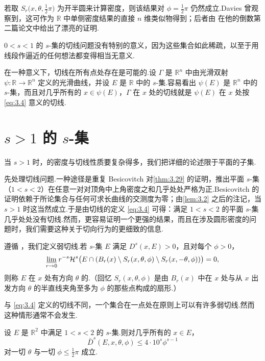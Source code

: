 若取 $S_r\bigl(x,\theta,\frac{1}{2}\pi\bigr)$ 为开半圆来计算密度，则该结果对 $\phi=\frac{1}{2}\pi$ 仍然成立.Davies 曾观察到，这可作为 $\mathbb{R}$ 中单侧密度结果的直接 $n$ 维类似物得到；后者由 \textcite{besicovitch1968} 在他的倒数第二篇论文中给出了漂亮的证明.

$0<s<1$ 的 $s$-集的切线问题没有特别的意义，因为这些集合如此稀疏，以至于用线段作逼近的任何想法都变得相当无意义.

在一种意义下，切线在所有点处存在是可能的.设 $\Gamma$ 是 $\mathbb{R}^n$ 中由光滑双射 $\psi:\mathbb{R}\to\mathbb{R}^n$ 定义的光滑曲线，并设 $E$ 是 $\mathbb{R}$ 中的 $s$-集.容易看出 $\psi(E)$ 是 $\mathbb{R}^n$ 中的 $s$-集，而且对几乎所有的 $x\in\psi(E)$，$\Gamma$ 在 $x$ 处的切线就是 $\psi(E)$ 在 $x$ 处按 \eqref{eq:3.4} 意义的切线.

\section{\texorpdfstring{$s>1$ 的 $s$-集}{s>1 的 s-集}}

当 $s>1$ 时，的密度与切线性质要复杂得多，我们把详细的论述限于平面的子集.

先处理切线问题.一种途径是重复 Besicovitch 对\cref{thm:3.29} 的证明，推出平面 $s$-集（$1<s<2$）在任意一对对顶角中上角密度之和几乎处处严格为正.Besicovitch 的证明依赖于所论集合与任何可求长曲线的交测度为零；由\cref{lem:3.2} 之后的注记，当 $s>1$ 时这当然成立.于是由切线的定义 \eqref{eq:3.4} 可得：满足 $1<s<2$ 的平面 $s$-集几乎处处没有切线.然而，更容易证明一个更强的结果，而且在涉及圆形密度的问题时，我们需要这种关于切向行为的更细致的信息.

遵循 \textcite{marstrand1954a}，我们定义弱切线.若 $s$-集 $E$ 满足 $D^s(x,E)>0$，且对每个 $\phi>0$，
\begin{equation}\label{eq:4.7}
  \varliminf_{r\to 0}r^{-s}\mathcal{H}^{s}\bigl(E\cap(B_r(x)\setminus S_r(x,\theta,\phi)\setminus S_r(x,-\theta,\phi))\bigr)=0,
\end{equation}
则称 $E$ 在 $x$ 处有方向 $\theta$ 的.（回忆 $S_r(x,\theta,\phi)$ 是由 $B_r(x)$ 中在 $x$ 处与从 $x$ 出发方向 $\theta$ 的半直线夹角至多为 $\phi$ 的那些点构成的扇形.）

与 \eqref{eq:3.4} 定义的切线不同，一个集合在一点处在原则上可以有许多弱切线.然而这种情形通常不会发生.

\begin{lemma}\label{lem:4.5}
设 $E$ 是 $\mathbb{R}^2$ 中满足 $1<s<2$ 的 $s$-集.则对几乎所有的 $x\in E$，
\[
  \bar{D}^{s}(E,x,\theta,\phi)\leq 4\cdot 10^{s}\phi^{s-1}
\]
对一切 $\theta$ 与一切 $\phi\leq\frac{1}{2}\pi$ 成立.
\end{lemma}

